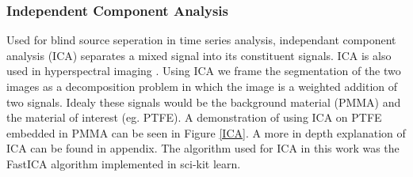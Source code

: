 \documentclass[a4paper,11pt]{article}
\begin{document}
  
  
  

\subsubsection{Independent Component Analysis}

Used for blind source seperation in time series analysis, independant component analysis (ICA) separates a mixed signal into its constituent signals. ICA is also used in hyperspectral imaging \cite{Villa2009OnAnalysis}. Using ICA we frame the segmentation of the two images as a decomposition problem in which the image is a weighted addition of two signals. Idealy these signals would be the background material (PMMA) and the material of interest (eg. PTFE). A demonstration of using ICA on PTFE embedded in PMMA can be seen in Figure \ref{ICA}. A more in depth explanation of ICA can be found in appendix. The algorithm used for ICA in this work was the FastICA \cite{Hyvarinen2000IndependentApplications} algorithm implemented in sci-kit learn.
\end{document}
